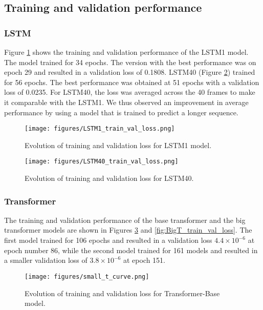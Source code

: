\documentclass[sigconf]{acmart}
\begin{document}
\subsection{Training and validation performance}

\subsubsection{LSTM}

Figure \ref{fig:lossLSTM1} shows the training and validation performance of the LSTM1 model. The model trained for 34 epochs. The version with the best performance was on epoch 29 and resulted in a validation loss of 0.1808. LSTM40 (Figure \ref{fig:lossLSTM40}) trained for 56 epochs. The best performance was obtained at 51 epochs with a validation loss of 0.0235. For LSTM40, the loss was averaged across the 40 frames to make it comparable with the LSTM1. We thus observed an improvement in average performance by using a model that is trained to predict a longer sequence.

\begin{figure}[htbp]
  \centering
  \texttt{[image: figures/LSTM1\_train\_val\_loss.png]}
  \caption{Evolution of training and validation loss for LSTM1 model.}
  \label{fig:lossLSTM1}
\end{figure}

\begin{figure}[htbp]
  \centering
  \texttt{[image: figures/LSTM40\_train\_val\_loss.png]}
  \caption{Evolution of training and validation loss for LSTM40.}
  \label{fig:lossLSTM40}
\end{figure}

\subsubsection{Transformer} The training and validation performance of the base transformer and the big transformer models are shown in Figures \ref{fig:BaseT_train_val_loss} and \ref{fig:BigT_train_val_loss}. The first model trained for 106 epochs and resulted in a validation loss $4.4\times 10^{-6} $ at epoch number 86, while the second model trained for 161 models and resulted in a smaller validation loss of $3.8\times 10^{-6} $ at epoch 151.

\begin{figure}[htbp]
  \centering
  \texttt{[image: figures/small\_t\_curve.png]}
  \caption{Evolution of training and validation loss for Transformer-Base model.}
  \label{fig:BaseT_train_val_loss}
\end{figure}
\end{document}
